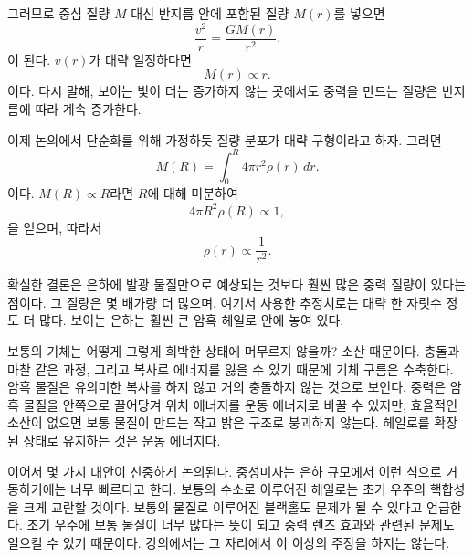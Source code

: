 그러므로 중심 질량 \(M\) 대신 반지름 안에 포함된 질량 \(M(r)\)를 넣으면
\begin{equation}
\frac{v^2}{r}=\frac{G M(r)}{r^2}.
\end{equation}
이 된다. \(v(r)\)가 대략 일정하다면
\begin{equation}
M(r)\propto r.
\end{equation}
이다. 다시 말해, 보이는 빛이 더는 증가하지 않는 곳에서도 중력을 만드는 질량은 반지름에 따라 계속 증가한다.

이제 논의에서 단순화를 위해 가정하듯 질량 분포가 대략 구형이라고 하자. 그러면
\begin{equation}
M(R)=\int_0^R 4\pi r^2\rho(r)\,dr.
\end{equation}
이다. \(M(R)\propto R\)라면 \(R\)에 대해 미분하여
\begin{equation}
4\pi R^2\rho(R)\propto 1,
\end{equation}
을 얻으며, 따라서
\begin{equation}
\rho(r)\propto \frac{1}{r^2}.
\end{equation}

\begin{classroomqa}
\end{classroomqa}

확실한 결론은 은하에 발광 물질만으로 예상되는 것보다 훨씬 많은 중력 질량이 있다는 점이다. 그 질량은 몇 배가량 더 많으며, 여기서 사용한 추정치로는 대략 한 자릿수 정도 더 많다. 보이는 은하는 훨씬 큰 암흑 헤일로 안에 놓여 있다.

보통의 기체는 어떻게 그렇게 희박한 상태에 머무르지 않을까? 소산 때문이다. 충돌과 마찰 같은 과정, 그리고 복사로 에너지를 잃을 수 있기 때문에 기체 구름은 수축한다. 암흑 물질은 유의미한 복사를 하지 않고 거의 충돌하지 않는 것으로 보인다. 중력은 암흑 물질을 안쪽으로 끌어당겨 위치 에너지를 운동 에너지로 바꿀 수 있지만, 효율적인 소산이 없으면 보통 물질이 만드는 작고 밝은 구조로 붕괴하지 않는다. 헤일로를 확장된 상태로 유지하는 것은 운동 에너지다.

이어서 몇 가지 대안이 신중하게 논의된다. 중성미자는 은하 규모에서 이런 식으로 거동하기에는 너무 빠르다고 한다. 보통의 수소로 이루어진 헤일로는 초기 우주의 핵합성을 크게 교란할 것이다. 보통의 물질로 이루어진 블랙홀도 문제가 될 수 있다고 언급한다. 초기 우주에 보통 물질이 너무 많다는 뜻이 되고 중력 렌즈 효과와 관련된 문제도 일으킬 수 있기 때문이다. 강의에서는 그 자리에서 이 이상의 주장을 하지는 않는다.

